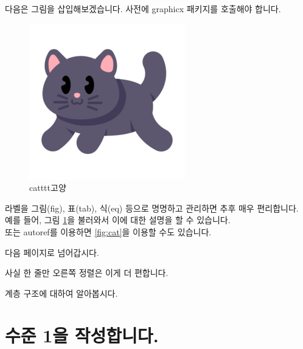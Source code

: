 \documentclass{article} %
\begin{document}
\vspace{2em}
다음은 그림을 삽입해보겠습니다. 사전에 graphicx 패키지를 호출해야 합니다.\\

\begin{figure}[h] %
\centering %
\includegraphics[scale=0.5]{cat} %
\caption{catttt고양} %
\label{fig:cat} %
\end{figure}

라벨을 그림(fig), 표(tab), 식(eq) 등으로 명명하고 관리하면 추후 매우 편리합니다.\\
예를 들어, 그림 \ref{fig:cat}을 불러와서 이에 대한 설명을 할 수 있습니다. \\
또는 autoref를 이용하면 \autoref{fig:cat}을 이용할 수도 있습니다. \\

\begin{flushright} %
다음 페이지로 넘어갑시다.
\end{flushright}

\hfill 사실 한 줄만 오른쪽 정렬은 이게 더 편합니다.

\newpage %

계층 구조에 대하여 알아봅시다.
\part{수준 1을 작성합니다.}
\end{document}
